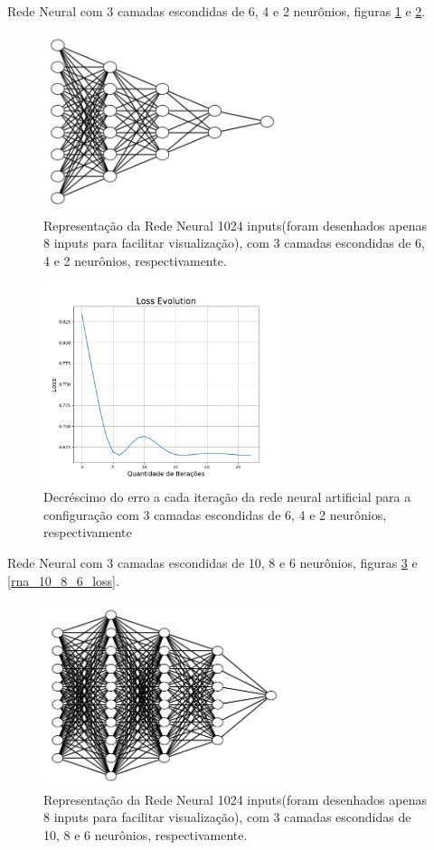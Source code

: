 \documentclass{article}
\begin{document}
\vspace{4cm}
Rede Neural com 3 camadas escondidas de 6, 4 e 2 neurônios, figuras \ref{rna_6_4_2} e \ref{rna_6_4_2_loss}.

\begin{figure}[ht]
\centering
\includegraphics[width=7cm]{rna_6_4_2}
\caption{Representação da Rede Neural 1024 inputs(foram desenhados apenas 8 inputs para facilitar visualização), com 3 camadas escondidas de 6, 4 e 2 neurônios, respectivamente.}
\label{rna_6_4_2}
\end{figure}

\begin{figure}[ht]
\centering
\includegraphics[width=7cm]{rna_6_4_2_loss}
\caption{Decréscimo do erro a cada iteração da rede neural artificial para a configuração com 3 camadas escondidas de 6, 4 e 2 neurônios, respectivamente}
\label{rna_6_4_2_loss}
\end{figure}

\vspace{8cm}
Rede Neural com 3 camadas escondidas de 10, 8 e 6 neurônios, figuras \ref{rna_10_8_6} e \ref{rna_10_8_6_loss}.

\begin{figure}[ht]
\centering
\includegraphics[width=7cm]{rna_10_8_6}
\caption{Representação da Rede Neural 1024 inputs(foram desenhados apenas 8 inputs para facilitar visualização), com 3 camadas escondidas de 10, 8 e 6 neurônios, respectivamente.}
\label{rna_10_8_6}
\end{figure}
\end{document}
